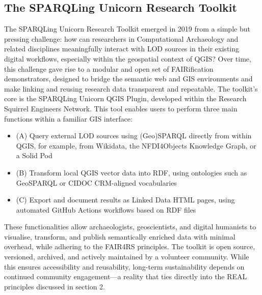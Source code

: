 \documentclass{eceasst}
\begin{document}
\subsection{The SPARQLing Unicorn Research Toolkit}\label{sec:32}

The SPARQLing Unicorn Research Toolkit emerged in 2019 from a simple but pressing challenge: how can researchers in Computational Archaeology and related disciplines meaningfully interact with LOD sources in their existing digital workflows, especially within the geospatial context of QGIS? Over time, this challenge gave rise to a modular and open set of FAIRification demonstrators, designed to bridge the semantic web and GIS environments and make linking and reusing research data transparent and repeatable. The toolkit's core is the SPARQLing Unicorn QGIS Plugin, developed within the Research Squirrel Engineers Network. This tool enables users to perform three main functions within a familiar GIS interface:

\begin{itemize}
    \item (A) Query external LOD sources using (Geo)SPARQL directly from within QGIS, for example, from Wikidata, the NFDI4Objects Knowledge Graph, or a Solid Pod
    \item (B) Transform local QGIS vector data into RDF, using ontologies such as GeoSPARQL or CIDOC CRM-aligned vocabularies
    \item (C) Export and document results as Linked Data HTML pages, using automated GitHub Actions workflows based on RDF files
\end{itemize}

These functionalities allow archaeologists, geoscientists, and digital humanists to visualise, transform, and publish semantically enriched data with minimal overhead, while adhering to the FAIR4RS principles. The toolkit is open source, versioned, archived, and actively maintained by a volunteer community. While this ensures accessibility and reusability, long-term sustainability depends on continued community engagement—a reality that ties directly into the REAL principles discussed in section 2.
\end{document}
